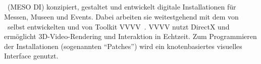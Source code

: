 \subsection{\mesodi}
\label{sec:em_meso_digital_initeriors}

\mesodi~(MESO DI) konzipiert, gestaltet und entwickelt digitale Installationen
für Messen, Museen und Events.  Dabei arbeiten sie weitestgehend mit dem von
\meso~selbst entwickelten und von Toolkit VVVV~\cite{v4}.  VVVV nutzt DirectX
und ermöglicht 3D-Video-Rendering und Interaktion in Echtzeit.  Zum
Programmieren der Installationen (sogenannten \enquote{Patches}) wird ein
knotenbasiertes visuelles Interface genutzt.
